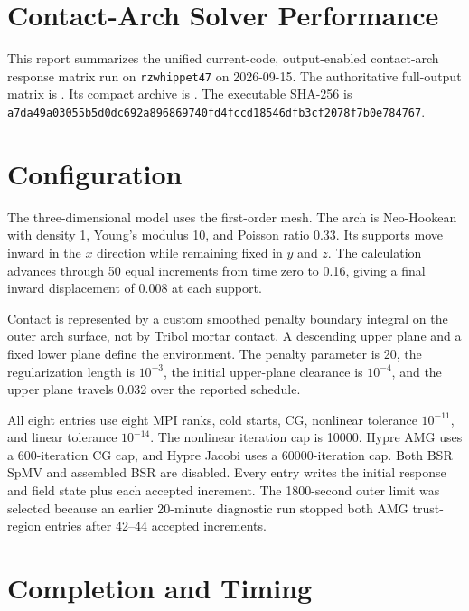 \documentclass[11pt]{article}
\begin{document}
\sloppy

\section*{Contact-Arch Solver Performance}

This report summarizes the unified current-code, output-enabled contact-arch
response matrix run on \texttt{rzwhippet47} on 2026-09-15.  The authoritative
full-output matrix is
.
Its compact archive is
.
The executable SHA-256 is
\texttt{a7da49a03055b5d0dc692a896869740fd4fccd18546dfb3cf2078f7b0e784767}.

\section*{Configuration}

The three-dimensional model uses the first-order
 mesh.  The arch is Neo-Hookean with density 1,
Young's modulus 10, and Poisson ratio 0.33.  Its supports move inward in the
$x$ direction while remaining fixed in $y$ and $z$.  The calculation advances
through 50 equal increments from time zero to 0.16, giving a final inward
displacement of 0.008 at each support.

Contact is represented by a custom smoothed penalty boundary integral on the
outer arch surface, not by Tribol mortar contact.  A descending upper plane and
a fixed lower plane define the environment.  The penalty parameter is 20, the
regularization length is $10^{-3}$, the initial upper-plane clearance is
$10^{-4}$, and the upper plane travels 0.032 over the reported schedule.

All eight entries use eight MPI ranks, cold starts, CG, nonlinear tolerance
$10^{-11}$, and linear tolerance $10^{-14}$.  The nonlinear iteration cap is
10000.  Hypre AMG uses a 600-iteration CG cap, and Hypre Jacobi uses a
60000-iteration cap.  Both BSR SpMV and assembled BSR are disabled.  Every
entry writes the initial response and field state plus each accepted
increment.  The 1800-second outer limit was selected because an earlier
20-minute diagnostic run stopped both AMG trust-region entries after 42--44
accepted increments.

\section*{Completion and Timing}
\end{document}
